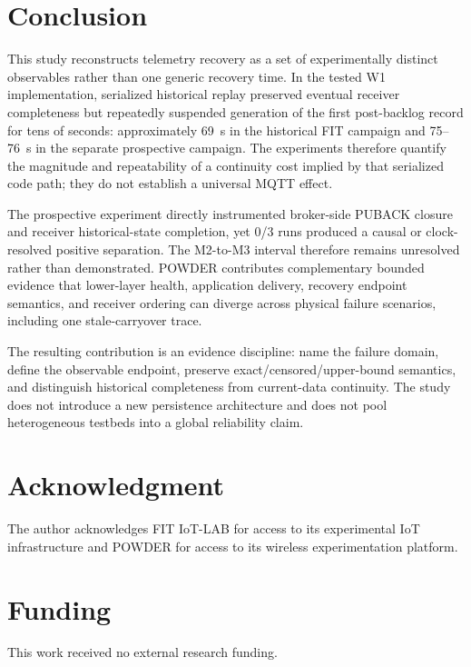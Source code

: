 \documentclass[journal]{IEEEtran}
\begin{document}
\section{Conclusion}
\label{sec:conclusion}

This study reconstructs telemetry recovery as a set of experimentally distinct observables rather than one generic recovery time. In the tested W1 implementation, serialized historical replay preserved eventual receiver completeness but repeatedly suspended generation of the first post-backlog record for tens of seconds: approximately 69~s in the historical FIT campaign and 75--76~s in the separate prospective campaign. The experiments therefore quantify the magnitude and repeatability of a continuity cost implied by that serialized code path; they do not establish a universal MQTT effect.

The prospective experiment directly instrumented broker-side PUBACK closure and receiver historical-state completion, yet 0/3 runs produced a causal or clock-resolved positive separation. The M2-to-M3 interval therefore remains unresolved rather than demonstrated. POWDER contributes complementary bounded evidence that lower-layer health, application delivery, recovery endpoint semantics, and receiver ordering can diverge across physical failure scenarios, including one stale-carryover trace.

The resulting contribution is an evidence discipline: name the failure domain, define the observable endpoint, preserve exact/censored/upper-bound semantics, and distinguish historical completeness from current-data continuity. The study does not introduce a new persistence architecture and does not pool heterogeneous testbeds into a global reliability claim.

\section*{Acknowledgment}
The author acknowledges FIT IoT-LAB for access to its experimental IoT infrastructure and POWDER for access to its wireless experimentation platform.

\section*{Funding}
This work received no external research funding.
\end{document}
